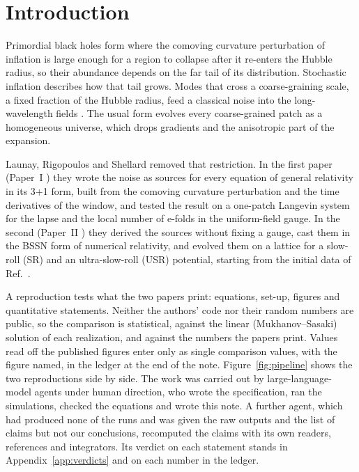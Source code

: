 \documentclass[aps,prd,twocolumn,10pt,superscriptaddress,nofootinbib,longbibliography,floatfix]{revtex4-2}
\newcommand{\Pone}{Paper~I}
\newcommand{\Ptwo}{Paper~II}
\begin{document}
\maketitle

\section{Introduction}\label{sec:intro}

Primordial black holes form where the comoving curvature perturbation of inflation is large enough for a region to collapse after it re-enters the Hubble radius, so their abundance depends on the far tail of its distribution. Stochastic inflation describes how that tail grows. Modes that cross a coarse-graining scale, a fixed fraction of the Hubble radius, feed a classical noise into the long-wavelength fields \cite{Starobinsky:1986}. The usual form evolves every coarse-grained patch as a homogeneous universe, which drops gradients and the anisotropic part of the expansion.

Launay, Rigopoulos and Shellard removed that restriction. In the first paper (\Pone{} \cite{Launay:2024sigr}) they wrote the noise as sources for every equation of general relativity in its 3+1 form, built from the comoving curvature perturbation and the time derivatives of the window, and tested the result on a one-patch Langevin system for the lapse and the local number of e-folds in the uniform-field gauge. In the second (\Ptwo{} \cite{Launay:2025sinr}) they derived the sources without fixing a gauge, cast them in the BSSN form of numerical relativity, and evolved them on a lattice for a slow-roll (SR) and an ultra-slow-roll (USR) potential, starting from the initial data of Ref.~\cite{Launay:2025bd}.

A reproduction tests what the two papers print: equations, set-up, figures and quantitative statements. Neither the authors' code nor their random numbers are public, so the comparison is statistical, against the linear (Mukhanov--Sasaki) solution of each realization, and against the numbers the papers print. Values read off the published figures enter only as single comparison values, with the figure named, in the ledger at the end of the note. Figure~\ref{fig:pipeline} shows the two reproductions side by side. The work was carried out by large-language-model agents under human direction, who wrote the specification, ran the simulations, checked the equations and wrote this note. A further agent, which had produced none of the runs and was given the raw outputs and the list of claims but not our conclusions, recomputed the claims with its own readers, references and integrators. Its verdict on each statement stands in Appendix~\ref{app:verdicts} and on each number in the ledger.
\end{document}
